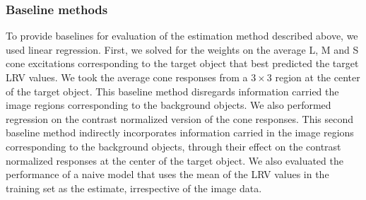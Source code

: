 \documentclass{jov}
\begin{document}
\subsubsection*{Baseline methods}

To provide baselines for evaluation of the estimation method described above, we used linear regression.
First, we solved for the weights on the average L, M and S cone excitations corresponding to the target object that best predicted the target LRV values.
We took the average cone responses from a $3 \times 3$ region at the center of the target object.
This baseline method disregards information carried the image regions corresponding to the background objects.
We also performed regression on the contrast normalized version of the cone responses.
This second baseline method indirectly incorporates information carried in the image regions corresponding to the background objects,
through their effect on the contrast normalized responses at the center of the target object. 
We also evaluated the performance of a naive model that uses the mean of the LRV values in the training set as the estimate, irrespective
of the image data.
\end{document}
